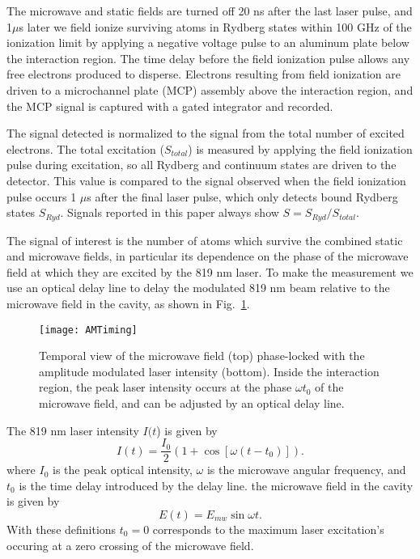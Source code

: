 \documentclass[aps,pra,preprint,groupedaddress]{revtex4-1}
\begin{document}
The microwave and static fields are turned off 20 ns after the last laser pulse, and 1$\mu$s later we field ionize surviving atoms in Rydberg states within 100 GHz of the ionization limit by applying a negative voltage pulse to an aluminum plate below the interaction region. The time delay before the field ionization pulse allows any free electrons produced to disperse. Electrons resulting from field ionization are driven to a microchannel plate (MCP) assembly above the interaction region, and the MCP signal is captured with a gated integrator and recorded.

The signal detected is normalized to the signal from the total number of excited electrons. The total excitation ($S_{total}$) is measured by applying the field ionization pulse during excitation, so all Rydberg and continuum states are driven to the detector. This value is compared to the signal observed when the field ionization pulse occurs 1 $\mu$s after the final laser pulse, which only detects bound Rydberg states $S_{Ryd}$. Signals reported in this paper always show $S = S_{Ryd} / S_{total}$.

The signal of interest is the number of atoms which survive the combined static and microwave fields, in particular its dependence on the phase of the microwave field at which they are excited by the 819 nm laser. To make the measurement we use an optical delay line to delay the modulated 819 nm beam relative to the microwave field in the cavity, as shown in Fig.~\ref{fig:AMLaser}.

\begin{figure}
	\texttt{[image: AMTiming]}
	\caption{Temporal view of the microwave field (top) phase-locked with the amplitude modulated laser intensity (bottom). Inside the interaction region, the peak laser intensity occurs at the phase $\omega t_0$ of the microwave field, and can be adjusted by an optical delay line.}
	\label{fig:AMLaser}
\end{figure}

The 819 nm laser intensity $I(t$) is given by
\begin{equation}
I(t) =\frac{I_0}{2}(1+\cos{[\omega (t-t_0)]}).
\end{equation}
where $I_0$ is the peak optical intensity, $\omega$ is the microwave angular frequency, and $t_0$ is the time delay introduced by the delay line. the microwave field in the cavity is given by
\begin{equation}
E(t) =E_{mw}\sin{\omega t}.
\end{equation}
With these definitions $t_0=0$ corresponds to the maximum laser excitation's occuring at a zero crossing of the microwave field.
\end{document}
